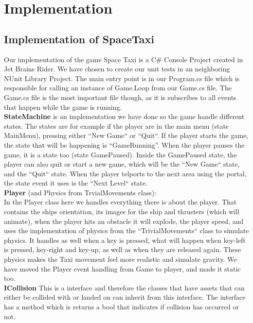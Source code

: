 \documentclass[../master.tex]{subfile}
\begin{document}
\section{Implementation}
\subsection{Implementation of SpaceTaxi}
Our implementation of the game Space Taxi is a C\# Console Project created in Jet Brains Rider. We have chosen to create our unit tests in an neighboring NUnit Library Project. The main entry point is in our Program.cs file which is responsible for calling an instance of Game.Loop from our Game.cs file. The Game.cs file is the most important file though, as it is subscribes to all events that happen while the game is running.\\

\textbf{StateMachine}
is an implementation we have done so the game handle different states. The states are for example if the player are in the main menu (state MainMenu), pressing either ``New Game`` or ``Quit``. If the player starts the game, the state that will be happening is ``GameRunning''. When the player pauses the game, it is a state too (state GamePaused). Inside the GamePaused state, the player can also quit or start a new game, which will be the ``New Game`` state, and the ``Quit`` state. When the player telports to the next area using the portal, the state event it uses is the ``Next Level`` state.\\

\textbf{Player} (and Physics from TrvialMovements class):\\
In the Player class here we handles everything there is about the player. That contains the ships orientation, its images for the ship and thrusters (which will animate), when the player hits an obstacle it will explode, the player speed, and uses the implementation of physics from the ``TrivialMovements`` class to simulate physics. It handles as well when a key is pressed, what will happen when key-left is pressed, key-right and key-up, as well as when they are released again. These physics makes the Taxi movement feel more realistic and simulate gravity. We have moved the Player event handling from Game to player, and made it static too.\\

\textbf{ICollision}
This is a interface and therefore the classes that have assets that can either be collided with or landed on can inherit from this interface. The interface has a method which is returns a bool that indicates if collision has occurred or not.
\end{document}
